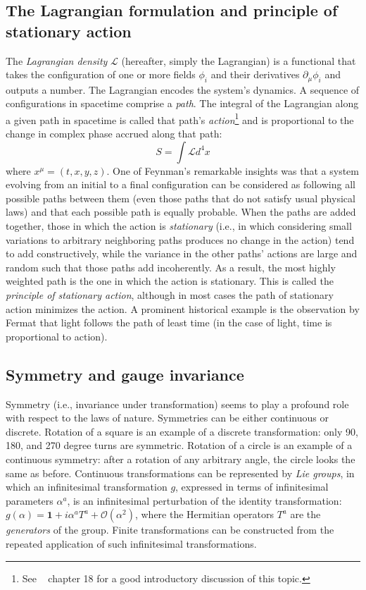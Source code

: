\subsection{The Lagrangian formulation and principle of stationary action}
The \textit{Lagrangian density} $\mathcal{L}$ (hereafter, simply the Lagrangian)
is a functional that takes the configuration of one or more fields $\phi_i$ and
their derivatives $\partial_\mu\phi_i$ and outputs a number. The Lagrangian
encodes the system's dynamics. A sequence of configurations in spacetime
comprise a \textit{path}. The integral of the Lagrangian along a given path in
spacetime is called that path's \textit{action}\footnote{See
~\cite{Klauber:1550150} chapter 18 for a good introductory discussion of this
topic.} and is proportional to the change in complex phase accrued along that
path:
\begin{equation}
S = \int \mathcal{L} d^4x
\end{equation}
where $x^\mu = (t, x, y, z)$. One of Feynman's remarkable insights was that a
system evolving from an initial to a final configuration can be considered as
following all possible paths between them (even those paths that do not satisfy
usual physical laws) and that each possible path is equally probable. When the
paths are added together, those in which the action is \textit{stationary}
(i.e., in which considering small variations to arbitrary neighboring paths
produces no change in the action) tend to add constructively, while the variance
in the other paths' actions are large and random such that those paths add
incoherently. As a result, the most highly weighted path is the one in which the
action is stationary. This is called the \textit{principle of stationary
action}, although in most cases the path of stationary action minimizes the
action. A prominent historical example is the observation by Fermat that light
follows the path of least time (in the case of light, time is proportional to
action).

\subsection{Symmetry and gauge invariance}
\label{sec:symmetry}
Symmetry (i.e., invariance under transformation) seems to play a profound role
with respect to the laws of nature. Symmetries can be either continuous or
discrete. Rotation of a square is an example of a discrete transformation: only
90, 180, and 270 degree turns are symmetric. Rotation of a circle is an example
of a continuous symmetry: after a rotation of any arbitrary angle, the circle
looks the same as before. Continuous transformations can be represented by
\textit{Lie groups}, in which an infinitesimal transformation $g$, expressed in
terms of infinitesimal parameters $\alpha^a$, is an infinitesimal perturbation
of the identity transformation: $g(\alpha) = \mathbf{1} + i\alpha^aT^a +
\mathcal{O}(\alpha^2)$, where the Hermitian operators $T^a$ are the
\textit{generators} of the group. Finite transformations can be constructed from
the repeated application of such infinitesimal transformations.

